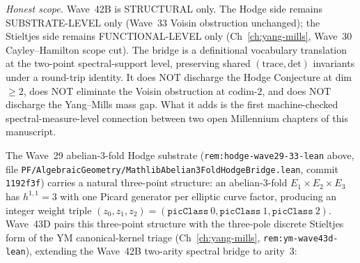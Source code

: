 \begin{remark}
\emph{Honest scope.} Wave~42B is STRUCTURAL only. The Hodge side remains SUBSTRATE-LEVEL only (Wave~33 Voisin obstruction unchanged); the Stieltjes side remains FUNCTIONAL-LEVEL only (Ch~\ref{ch:yang-mills}, Wave~30 Cayley--Hamilton scope cut). The bridge is a definitional vocabulary translation at the two-point spectral-support level, preserving shared $(\mathrm{trace}, \mathrm{det})$ invariants under a round-trip identity. It does NOT discharge the Hodge Conjecture at dim~$\geq 2$, does NOT eliminate the Voisin obstruction at codim-$2$, and does NOT discharge the Yang--Mills mass gap. What it adds is the first machine-checked spectral-measure-level connection between two open Millennium chapters of this manuscript.
\end{remark}

\begin{remark}\label{rem:hodge-wave43d-lean}
The Wave~29 abelian-3-fold Hodge substrate (\texttt{rem:hodge-wave29-33-lean} above, file \texttt{PF/AlgebraicGeometry/MathlibAbelian3FoldHodgeBridge.lean}, commit \texttt{1192f3f}) carries a natural three-point structure: an abelian-3-fold $E_1 \times E_2 \times E_3$ has $h^{1,1} = 3$ with one Picard generator per elliptic curve factor, producing an integer weight triple $(z_0, z_1, z_2) = (\texttt{picClass}~0, \texttt{picClass}~1, \texttt{picClass}~2)$. Wave~43D pairs this three-point structure with the three-pole discrete Stieltjes form of the YM canonical-kernel triage (Ch~\ref{ch:yang-mills}, \texttt{rem:ym-wave43d-lean}), extending the Wave~42B two-arity spectral bridge to arity~$3$:
\begin{itemize}

\end{itemize}
\end{remark}
